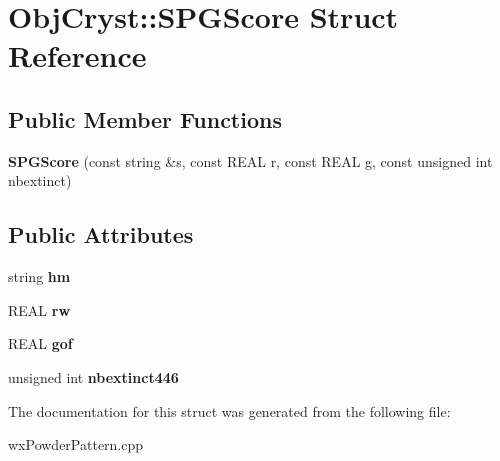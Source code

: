 \hypertarget{struct_obj_cryst_1_1_s_p_g_score}{}\section{Obj\+Cryst\+::S\+P\+G\+Score Struct Reference}
\label{struct_obj_cryst_1_1_s_p_g_score}
\subsection*{Public Member Functions}
\begin{DoxyCompactItemize}
\item 
\mbox{\label{struct_obj_cryst_1_1_s_p_g_score_aadbee653366dcf6e4fd3f99fbf9b6124}} 
{\bfseries S\+P\+G\+Score} (const string \&s, const R\+E\+AL r, const R\+E\+AL g, const unsigned int nbextinct)
\end{DoxyCompactItemize}
\subsection*{Public Attributes}
\begin{DoxyCompactItemize}
\item 
\mbox{\label{struct_obj_cryst_1_1_s_p_g_score_a7817f5576dc6d5509447fca10b00cf2b}} 
string {\bfseries hm}
\item 
\mbox{\label{struct_obj_cryst_1_1_s_p_g_score_a4fad40ff870a278810c0b7e03c6a27d4}} 
R\+E\+AL {\bfseries rw}
\item 
\mbox{\label{struct_obj_cryst_1_1_s_p_g_score_a314e38472754df374b3a000f15e0c128}} 
R\+E\+AL {\bfseries gof}
\item 
\mbox{\label{struct_obj_cryst_1_1_s_p_g_score_a312001d24e5a408ee373cedc65636ab7}} 
unsigned int {\bfseries nbextinct446}
\end{DoxyCompactItemize}


The documentation for this struct was generated from the following file\+:\begin{DoxyCompactItemize}
\item 
wx\+Powder\+Pattern.\+cpp\end{DoxyCompactItemize}
